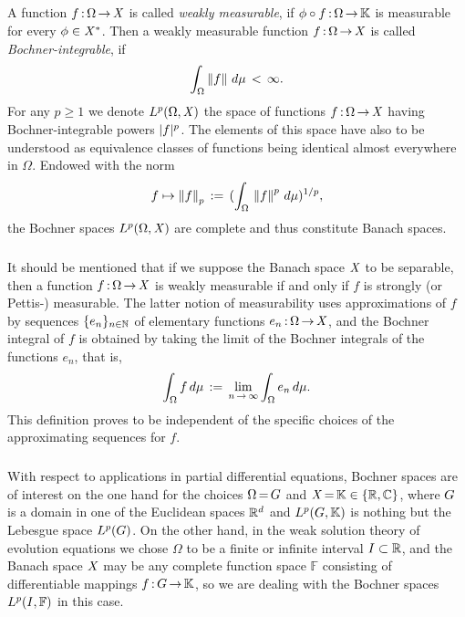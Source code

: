 \documentclass[11pt,twoside]{article}
\begin{document}
\subparagraph*{} %
A function $f{\,:\,}\Omega {\,\to\,} \mathit{X}$ is called \textit{weakly measurable},
if $\phi \circ f{\,:\,}\Omega {\,\to\,} {\mathbb{K}}$ is measurable for every $\phi \in \mathit{X}^*$.
Then a weakly measurable function $f{\,:\,}\Omega {\,\to\,} \mathit{X}$
is called \textit{Bochner-integrable},
if
\[
\int_{\Omega} \left\lVert f \right\rVert \,d\mu \, < \, \infty.
\]
For any $p \geq 1$
we denote $L^p(\Omega,\mathit{X})$ the space of functions $f{\,:\,}\Omega {\,\to\,} \mathit{X}$
having Bochner-integrable powers $\abs{f} ^{p}$.
The elements of this space have also to be understood
as equivalence classes of functions
being identical almost everywhere in $\Omega$.
Endowed with the norm
\[
f \mapsto \left\lVert f \right\rVert_p \,:=\, (\int_{\Omega} \, \left\lVert f \right\rVert ^p \, d\mu)^{1/p},
\]
the Bochner spaces $L^p(\Omega,\mathit{X})$ are complete
and thus constitute Banach spaces.

\subparagraph*{} %
It should be mentioned that
if we suppose the Banach space $\mathit{X}$ to be separable,
then a function $f{\,:\,}\Omega {\,\to\,} \mathit{X}$ is weakly measurable
if and only if $f$ is strongly (or Pettis-) measurable.
The latter notion of measurability uses approximations of $f$ by sequences
$\{e_n\}_{n \in {\mathbb{N}}}$ of elementary functions $e_n{\,:\,}\Omega {\,\to\,} \mathit{X}$,
and the Bochner integral of $f$ is obtained by taking the limit of the
Bochner integrals of the functions $e_n$,
that is,
\[
\int_{\Omega} f \,d\mu \,:=\, \lim_{n {\,\to\,} \infty} \int_{\Omega} e_n \, d\mu.
\]
This definition proves to be independent of the specific choices
of the approximating sequences for $f$.

\subparagraph*{} %
With respect to applications in partial differential equations,
Bochner spaces are of interest on the one hand 
for the choices $\Omega {\,=\,} G$ and $\mathit{X} {\,=\,} {\mathbb{K}} \in \{{\mathbb{R}},{\mathbb{C}}\}$,
where $G$ is a domain in one of the Euclidean spaces ${\mathbb{R}}^d$
and $L^p(G,{\mathbb{K}})$ is nothing but the Lebesgue space $L^p(G)$.
On the other hand,
in the weak solution theory of evolution equations
we chose $\Omega$ to be a finite or infinite interval $I \subset {\mathbb{R}}$,
and the Banach space $\mathit{X}$ may be any complete function space $\mathbb{F}$
consisting of differentiable mappings $f{\,:\,}G {\,\to\,} {\mathbb{K}}$,
so we are dealing with the Bochner spaces $L^p(I,\mathbb{F})$ in this case.
\end{document}
